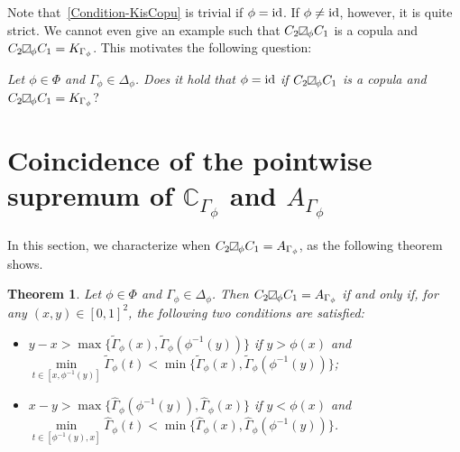 \documentclass[12pt]{article}
\theoremstyle{plain}
\newtheorem{thrm}{Theorem}[section]
\theoremstyle{definition}
\newcommand{\MySs}{
\begin{tikzpicture}[baseline]
\draw (0,0em) -- (0em,0.6em) -- (0.6em,0.6em) -- (0.6em,0em) -- (0,0em);
\draw (0,0em) parabola (0.6em, 0.6em);
\end{tikzpicture}}
\begin{document}
Note that~\eqref{Condition-KisCopu} is trivial if $\phi=\rm{id}$. If $\phi\neq \rm{id}$, however, it is quite strict. We cannot even give an example such that $C_2\MySs_\phi C_1$ is a copula and $C_2\MySs_\phi C_1=K_{\Gamma_\phi}$. This motivates the following question:

\emph{Let $\phi\in\Phi$ and $\Gamma_\phi\in\Delta_\phi$. Does it hold that $\phi=\rm{id}$ if $C_2\MySs_\phi C_1$ is a copula and $C_2\MySs_\phi C_1=K_{\Gamma_\phi}$}?


\section{Coincidence of the pointwise supremum of $\mathbb{C}_{\Gamma_\phi}$ and $A_{\Gamma_\phi}$}\label{Sec-ChaCoin}

In this section, we characterize when $C_2\MySs_\phi C_1=A_{\Gamma_\phi}$, as the following theorem shows.
\begin{thrm}\label{thrm-C=A}
Let $\phi\in\Phi$ and $\Gamma_\phi\in\Delta_\phi$. Then $C_2\MySs_\phi C_1=A_{\Gamma_\phi}$ if and only if, for any
$(x, y)\in[0, 1]^2$, the following two conditions are satisfied:
\begin{itemize}%
\item[\rm (i)] $y-x>\max\{\tilde{\Gamma}_\phi(x), \tilde{\Gamma}_\phi(\phi^{-1}(y))\}$ if $y>\phi(x)$ and $\min\limits_{t\in [x, \phi^{-1}(y)]}\tilde{\Gamma}_\phi(t)<\min\{\tilde{\Gamma}_\phi(x), \tilde{\Gamma}_\phi(\phi^{-1}(y))\}$;

\item[\rm (ii)] $x-y>\max\{\hat{\Gamma}_\phi(\phi^{-1}(y)), \hat{\Gamma}_\phi(x)\}$ if $y<\phi(x)$ and $\min\limits_{t\in [\phi^{-1}(y), x]}\hat{\Gamma}_\phi(t)<\min\{\hat{\Gamma}_\phi(x), \hat{\Gamma}_\phi(\phi^{-1}(y))\}$.
\end{itemize}
\end{thrm}
\end{document}
